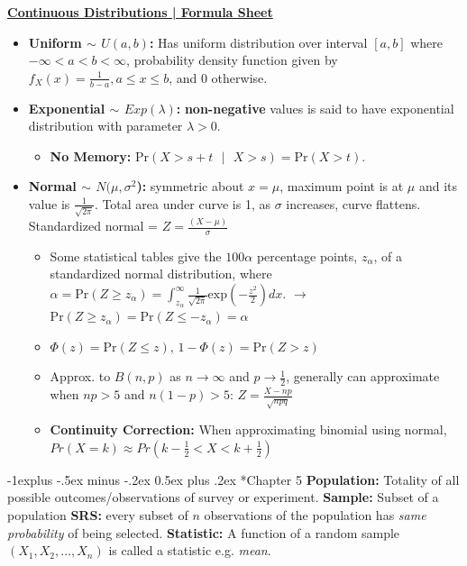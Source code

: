 \documentclass[10pt,landscape]{article}
\makeatletter
\renewcommand{\subsection}{\@startsection{subsection}{2}{0mm}%
                                {-1explus -.5ex minus -.2ex}%
                                {0.5ex plus .2ex}%
                                {\normalfont\normalsize\bfseries}}
\makeatother
\begin{document}
\begin{multicols*}{3}
\textbf{\underline{Continuous Distributions | Formula Sheet}}
\begin{itemize}[topsep=0pt,noitemsep,wide=0pt, leftmargin=\dimexpr{} + 2\relax]
    \item \textbf{Uniform $\sim$ $U(a,b)$:} Has uniform distribution over interval $[a,b]$ where $-\infty<a<b<\infty$, probability density function given by $f_X(x)=\frac{1}{b-a},a≤x≤b$, and $0$ otherwise.
    \item \textbf{Exponential $\sim$ $Exp(\lambda)$:} \textbf{non-negative} values is said to have exponential distribution with parameter $\lambda > 0$.
    \begin{itemize}[noitemsep,wide=0pt, leftmargin=\dimexpr{} + 2\relax]
        \item \textbf{No Memory:} $\text{Pr}(X>s+t\text{ }|\text{ }X>s)=\text{Pr}(X>t)$.
    \end{itemize} 
    \item \textbf{Normal $\sim$ $N(\mu, \sigma^2$):} symmetric about $x = \mu$, maximum point is at $\mu$ and its value is $\frac{1}{\sqrt{2\pi}}$. Total area under curve is 1, as $\sigma$ increases, curve flattens. Standardized normal = $Z = \frac{(X-\mu)}{\sigma}$ 
    \begin{itemize}[topsep=0pt,noitemsep,wide=0pt, leftmargin=\dimexpr{} + 2\relax]
        \item Some statistical tables give the $100\alpha$ percentage points, $z_\alpha$, of a standardized normal distribution, where $\alpha=\text{Pr}(Z≥z_\alpha)=\int_{z_\alpha}^\infty\frac{1}{\sqrt{2\pi}}\text{exp}(-\frac{z^2}{2})dx$. $\rightarrow$ $\text{Pr}(Z≥z_\alpha)=\text{Pr}(Z≤-z_\alpha)=\alpha$
        \item $\Phi(z)=\text{Pr}(Z≤z)$, $1-\Phi(z)=\text{Pr}(Z>z)$
        \item Approx. to $B(n,p)$ as $n \rightarrow \infty$ and $p \rightarrow \frac{1}{2}$, generally can approximate when $np > 5$ and $n(1-p) > 5$: $Z=\frac{X-np}{\sqrt{npq}}$
        \item \textbf{Continuity Correction:} When approximating binomial using normal, $Pr(X=k) \approx Pr(k-\frac{1}{2} < X < k + \frac{1}{2})$
    \end{itemize}
\end{itemize}

\subsection*{Chapter 5}
\textbf{Population:} Totality of all possible outcomes/observations of survey or experiment. \textbf{Sample:} Subset of a population 
\textbf{SRS:} every subset of $n$ observations of the population has \textit{same probability} of being selected.
\textbf{Statistic:} A function of a random sample $(X_1,X_2,\ldots,X_n)$ is called a statistic e.g. \textit{mean}.


\end{multicols*}
\end{document}
